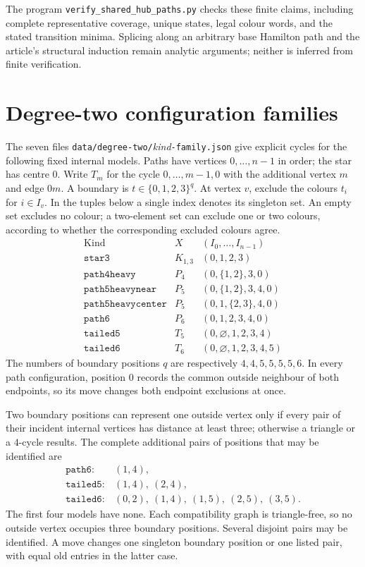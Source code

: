 The program \texttt{verify\_shared\_hub\_paths.py} checks these finite
claims, including complete representative coverage, unique states, legal colour
words, and the stated transition minima.
Splicing along an
arbitrary base Hamilton path and the article's structural induction
remain analytic arguments; neither is inferred from finite verification.

\clearpage
\section{Degree-two configuration families}
\label{app:degree-two-family-constructions}
The seven files \texttt{data/degree-two/}\emph{kind}\texttt{-family.json}
give explicit cycles for the following fixed internal models. Paths have
vertices $0,\ldots,n-1$ in order; the star has centre $0$.
Write $T_m$ for the cycle $0,\ldots,m-1,0$ with the additional vertex
$m$ and edge $0m$. A boundary is $t\in\{0,1,2,3\}^q$.
At vertex $v$, exclude the colours $t_i$ for $i\in I_v$.
In the tuples below a single index denotes its singleton set.
An empty set excludes no colour; a two-element set can exclude one
or two colours, according to whether the corresponding excluded colours agree.
\[
\begin{array}{lcl}
\text{Kind}&X&(I_0,\ldots,I_{n-1})\\ \hline
\mathtt{star3}&K_{1,3}&(0,1,2,3)\\
\mathtt{path4heavy}&P_4&(0,\{1,2\},3,0)\\
\mathtt{path5heavynear}&P_5&(0,\{1,2\},3,4,0)\\
\mathtt{path5heavycenter}&P_5&(0,1,\{2,3\},4,0)\\
\mathtt{path6}&P_6&(0,1,2,3,4,0)\\
\mathtt{tailed5}&T_5&(0,\varnothing,1,2,3,4)\\
\mathtt{tailed6}&T_6&(0,\varnothing,1,2,3,4,5)
\end{array}
\]
The numbers of boundary positions $q$ are respectively $4,4,5,5,5,5,6$.
In every path configuration, position $0$ records the common outside neighbour of both
endpoints, so its move changes both endpoint exclusions at once.

Two boundary positions can represent one outside vertex only if every pair
of their incident internal vertices has distance at least three;
otherwise a triangle or a $4$-cycle results. The complete additional
pairs of positions that may be identified are
\[
\begin{array}{ll}
\mathtt{path6}:&(1,4),\\
\mathtt{tailed5}:&(1,4),\ (2,4),\\
\mathtt{tailed6}:&(0,2),\ (1,4),\ (1,5),\ (2,5),\ (3,5).
\end{array}
\]
The first four models have none. Each compatibility graph is
triangle-free, so no outside vertex occupies three boundary positions. Several
disjoint pairs may be identified. A move changes one singleton boundary position
or one listed pair, with equal old entries in the latter case.

